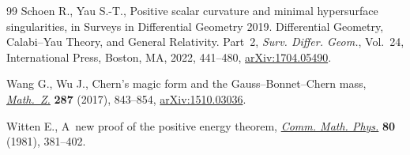 \documentclass[pdftex]{sigma}
\numberwithin{equation}{section}
\begin{document}
\begin{thebibliography}{99}
Schoen R., Yau S.-T., Positive scalar curvature and minimal hypersurface
 singularities, in Surveys in Differential Geometry 2019. {D}ifferential
 Geometry, {C}alabi--{Y}au Theory, and General Relativity. {P}art~2,
 \textit{Surv. Differ. Geom.}, Vol.~24, International Press, Boston, MA, 2022,
 441--480, \href{https://arxiv.org/abs/1704.05490}{arXiv:1704.05490}.


Wang G., Wu J., Chern's magic form and the {G}auss--{B}onnet--{C}hern mass,
 \href{https://doi.org/10.1007/s00209-017-1847-6}{\textit{Math.~Z.}} \textbf{287} (2017), 843--854, \href{https://arxiv.org/abs/1510.03036}{arXiv:1510.03036}.

Witten E., A~new proof of the positive energy theorem, \href{https://doi.org/10.1007/BF01208277}{\textit{Comm. Math.
 Phys.}} \textbf{80} (1981), 381--402.

\end{thebibliography}\LastPageEnding
\end{document}
